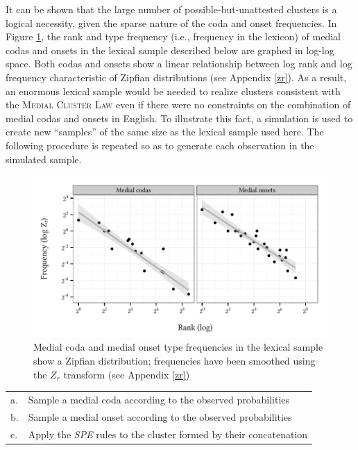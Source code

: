 It can be shown that the large number of possible-but-unattested clusters is a logical necessity, given the sparse nature of the coda and onset frequencies. 
In Figure \ref{cao}, the rank and type frequency (i.e., frequency in the lexicon) of medial codas and onsets in the lexical sample described below are graphed in log-log space. 
Both codas and onsets show a linear relationship between log rank and log frequency characteristic of Zipfian distributions (see Appendix \ref{zr}). 
As a result, an enormous lexical sample would be needed to realize clusters consistent with the \textsc{Medial Cluster Law} even if there were no constraints on the combination of medial codas and onsets in English.
To illustrate this fact, a simulation is used to create new ``samples'' of the same size as the lexical sample used here. The following procedure is repeated so as to generate each observation in the simulated sample.

\begin{figure}[t]
\centering
\includegraphics{co.pdf}
\caption{Medial coda and medial onset type frequencies in the lexical sample show a Zipfian distribution; frequencies have been smoothed using the $Z_r$ transform (see Appendix \ref{zr})}
\label{cao}
\end{figure}

\begin{example}
\begin{tabular}{l l}
a. & Sample a medial coda according to the observed probabilities  \\
b. & Sample a medial onset according to the observed probabilities \\
c. & Apply the \emph{SPE} rules to the cluster formed by their concatenation \\
\end{tabular}
\end{example}

